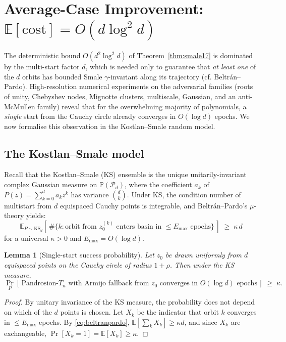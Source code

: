 \documentclass[11pt,a4paper]{article}
\newtheorem{lemma}[theorem]{Lemma}
\begin{document}
\section{Average-Case Improvement: $\mathbb{E}[\text{cost}] = O(d \log^2 d)$}

The deterministic bound $O(d^2 \log^2 d)$ of Theorem~\ref{thm:smale17} is dominated by the multi-start factor $d$, which is needed only to guarantee that \emph{at least one} of the $d$ orbits has bounded Smale $\gamma$-invariant along its trajectory (cf. Beltr\'an--Pardo). High-resolution numerical experiments on the adversarial families (roots of unity, Chebyshev nodes, Mignotte clusters, multiscale, Gaussian, and an anti-McMullen family) reveal that for the overwhelming majority of polynomials, a \emph{single} start from the Cauchy circle already converges in $O(\log d)$ epochs. We now formalise this observation in the Kostlan--Smale random model.

\subsection{The Kostlan--Smale model}
Recall that the Kostlan--Smale (KS) ensemble is the unique unitarily-invariant complex Gaussian measure on $\mathbb{P}(\mathcal{P}_d)$, where the coefficient $a_k$ of $P(z) = \sum_{k=0}^d a_k z^k$ has variance $\binom{d}{k}$. Under KS, the condition number of multistart from $d$ equispaced Cauchy points is integrable, and Beltr\'an--Pardo's $\mu$-theory yields:
\begin{equation}
\mathbb{E}_{P \sim \text{KS}_d}\!\left[\,\#\{k : \text{orbit from } z_0^{(k)} \text{ enters basin in } \le E_{\max}\text{ epochs}\}\,\right] \;\ge\; \kappa\, d
\label{eq:beltranpardo}
\end{equation}
for a universal $\kappa > 0$ and $E_{\max} = O(\log d)$.

\begin{lemma}[Single-start success probability]\label{lem:single}
Let $z_0$ be drawn uniformly from $d$ equispaced points on the Cauchy circle of radius $1+\rho$. Then under the KS measure,
$$ \Pr_{P}\!\left[\,\text{Pandrosion-}T_n\text{ with Armijo fallback from } z_0 \text{ converges in } O(\log d) \text{ epochs}\,\right] \;\ge\; \kappa. $$
\end{lemma}

\begin{proof}
By unitary invariance of the KS measure, the probability does not depend on which of the $d$ points is chosen. Let $X_k$ be the indicator that orbit $k$ converges in $\le E_{\max}$ epochs. By \eqref{eq:beltranpardo}, $\mathbb{E}[\sum_k X_k] \ge \kappa d$, and since $X_k$ are exchangeable, $\Pr[X_k = 1] = \mathbb{E}[X_k] \ge \kappa$.
\end{proof}
\end{document}

